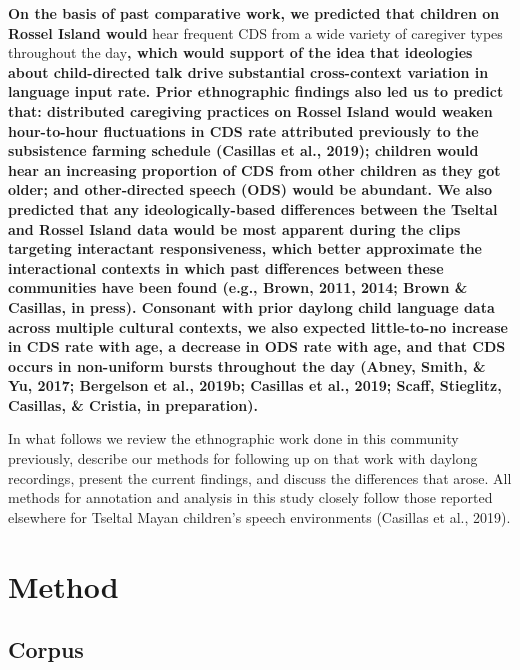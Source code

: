 \documentclass[,man,floatsintext]{apa6}
\begin{document}
\textbf{On the basis of past comparative work, we predicted that
children on Rossel Island would} hear frequent CDS from a wide variety
of caregiver types throughout the day\textbf{, which would support of
the idea that ideologies about child-directed talk drive substantial
cross-context variation in language input rate. Prior ethnographic
findings also led us to predict that: distributed caregiving practices
on Rossel Island would weaken hour-to-hour fluctuations in CDS rate
attributed previously to the subsistence farming schedule (Casillas et
al., 2019); children would hear an increasing proportion of CDS from
other children as they got older; and other-directed speech (ODS) would
be abundant. We also predicted that any ideologically-based differences
between the Tseltal and Rossel Island data would be most apparent during
the clips targeting interactant responsiveness, which better approximate
the interactional contexts in which past differences between these
communities have been found (e.g., Brown, 2011, 2014; Brown \& Casillas,
in press). Consonant with prior daylong child language data across
multiple cultural contexts, we also expected little-to-no increase in
CDS rate with age, a decrease in ODS rate with age, and that CDS occurs
in non-uniform bursts throughout the day (Abney, Smith, \& Yu, 2017;
Bergelson et al., 2019b; Casillas et al., 2019; Scaff, Stieglitz,
Casillas, \& Cristia, in preparation).}

In what follows we review the ethnographic work done in this community
previously, describe our methods for following up on that work with
daylong recordings, present the current findings, and discuss the
differences that arose. All methods for annotation and analysis in this
study closely follow those reported elsewhere for Tseltal Mayan
children's speech environments (Casillas et al., 2019).

\section{Method}\label{methods}

\subsection{Corpus}\label{methods-dataset}
\end{document}
